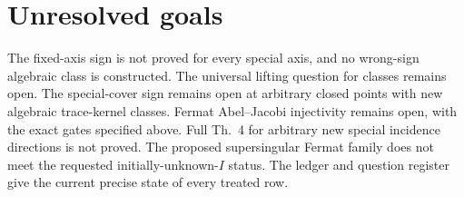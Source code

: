 \documentclass[11pt]{article}
\theoremstyle{remark}\newtheorem{remark}[theorem]{Remark}
\begin{document}
\section{Unresolved goals}
The fixed-axis sign is not proved for every special axis, and no
wrong-sign algebraic class is constructed. The universal lifting
question for classes remains open. The special-cover sign remains
open at arbitrary closed points with new algebraic trace-kernel
classes. Fermat Abel--Jacobi injectivity remains open, with the
exact gates specified above. Full Th.~4 for arbitrary new special
incidence directions is not proved. The proposed supersingular
Fermat family does not meet the requested initially-unknown-$I$
status. The ledger and question register give the current precise
state of every treated row.
\end{document}
